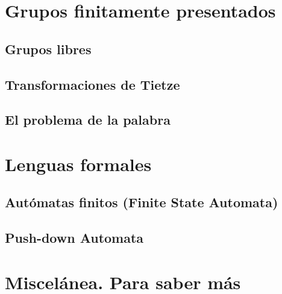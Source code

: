 \documentclass[twoside, 11pt]{article}
\begin{document}
\section{Grupos finitamente presentados}
\subsection{Grupos libres}
\subsection{Transformaciones de Tietze}
\subsection{El problema de la palabra}

\section{Lenguas formales}
\subsection{Autómatas finitos (Finite State Automata)}
\subsection{Push-down Automata}

\section{Miscelánea. Para saber más}
\end{document}

